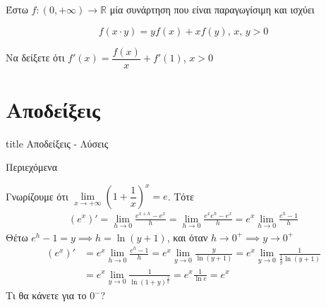 \documentclass{presentation}
\begin{document}
\begin{askisi}
    Έστω $f:(0,+\infty)\to\mathbb{R}$ μία συνάρτηση που είναι παραγωγίσιμη και ισχύει

    $$f(x\cdot y)=yf(x)+xf(y) \text{, } x \text{, } y>0$$

    Να δείξετε ότι $f'(x)=\dfrac{f(x)}{x}+f'(1)$, $x>0$

\end{askisi}

\appendix
\section*{Αποδείξεις}

\begin{frame}[noframenumbering]
    \vfill
    \centering
    \begin{beamercolorbox}[sep=8pt,center,shadow=true,rounded=true]{title}
        Αποδείξεις - Λύσεις
    \end{beamercolorbox}
    \vfill
\end{frame}

\begin{frame}{Περιεχόμενα }
    \tableofcontents
\end{frame}

\begin{apodiksi}[$(e^x)'=e^x$]
    Γνωρίζουμε ότι $\lim\limits_{x \to +\infty}{ \left( 1+\dfrac{1}{x} \right)^x  }=e$. Τότε
    \begin{align*}
        (e^x)'=\lim\limits_{h \to 0}{ \frac{e^{x+h}-e^x}{h} }=\lim\limits_{h \to 0}{ \frac{e^xe^h-e^x}{h} }
        =e^x\lim\limits_{h \to 0}{ \frac{e^h-1}{h} }
    \end{align*}
    Θέτω $e^h-1=y\implies h=\ln (y+1)$, και όταν $h\to 0^+\implies y\to 0^+$
    \begin{align*}
        (e^x)' & =e^x\lim\limits_{h \to 0}{ \frac{e^h-1}{h} }
        =e^x\lim\limits_{y \to 0}{ \frac{y}{\ln(y+1)} }
        =e^x\lim\limits_{y \to 0}{ \frac{1}{\frac{1}{y}\ln(y+1)} }             \\
               & =e^x\lim\limits_{y \to 0}{ \frac{1}{\ln(1+y)^{\frac{1}{y}}} }
        =e^x \frac{1}{\ln e }=e^x
    \end{align*}
    Τι θα κάνετε για το $0^-$?

    \hyperlink{Θεωρία}{}
\end{apodiksi}
\end{document}
